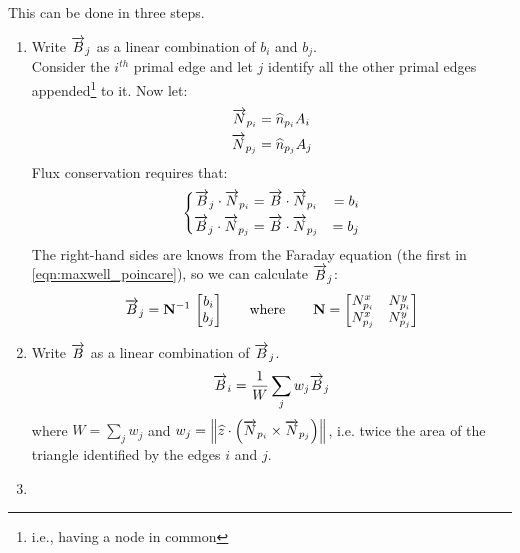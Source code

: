This can be done in three steps.
\begin{enumerate}
\item
  Write $\overrightarrow{B}_j$ as a linear combination of $b_i$ and $b_j$.\\
  \newline
  Consider the $i^{th}$ primal edge and let $j$ identify all the other
  primal edges appended\footnote{i.e., having a node in common} to
  it. Now let:
  \begin{equation*} \begin{aligned}
      \overrightarrow{N}_{p_i} & = \widehat{n}_{p_i} A_i \\
      \overrightarrow{N}_{p_j} & = \widehat{n}_{p_j} A_j
  \end{aligned} \end{equation*}
  Flux conservation requires that:
  \begin{equation*} \left\{ \begin{aligned}
      {\overrightarrow{B}_j \cdot \overrightarrow{N}_{p_i}} & =
      {\overrightarrow{B} \cdot \overrightarrow{N}_{p_i}} & = b_i \\
      {\overrightarrow{B}_j \cdot \overrightarrow{N}_{p_j}} & =
      {\overrightarrow{B} \cdot \overrightarrow{N}_{p_j}} & = b_j
  \end{aligned} \right. \end{equation*}
  The right-hand sides are knows from the Faraday equation (the first
  in \eqref{eqn:maxwell_poincare}), so we can calculate $\overrightarrow{B}_j$:
  \begin{equation*}
    \overrightarrow{B}_j = {\mathbf{N}^{-1}\,\begin{bmatrix} b_i \\ b_j \end{bmatrix}}
    \qquad \text{where} \qquad \mathbf{N} = \begin{bmatrix} N^x_{p_i}
    & N^y_{p_i} \\ N^x_{p_j} & N^y_{p_j} \end{bmatrix}
  \end{equation*}
\item
  Write $\overrightarrow{B}$ as a linear combination of $\overrightarrow{B}_j$.\\
  \newline
  \begin{equation*}
    \overrightarrow{B}_i = \frac{1}{W} \sum_j w_j \overrightarrow{B}_j
  \end{equation*}
  where $W = \sum_j w_j$ and $w_j = \left\lVert{\widehat{z} \cdot \left(
  {\overrightarrow{N}_{p_i} \times \overrightarrow{N}_{p_j}} \right)}\right\rVert$,
  i.e. twice the area of the triangle identified by the edges $i$ and
  $j$.
\item

\end{enumerate}
